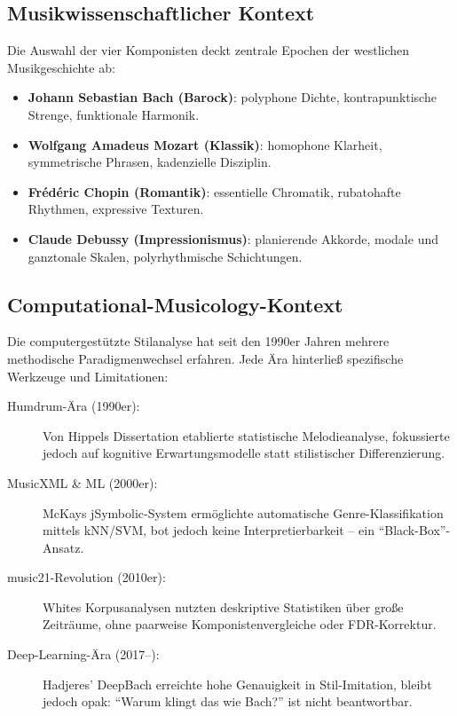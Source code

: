 \documentclass[12pt,a4paper]{article}
\theoremstyle{definition}
\begin{document}
\subsection{Musikwissenschaftlicher Kontext}
Die Auswahl der vier Komponisten deckt zentrale Epochen der westlichen Musikgeschichte ab:\autocite[Vgl. etwa][]{DebussyCharacteristics,ChopinTransformations}
\begin{itemize}
    \item \textbf{Johann Sebastian Bach (Barock)}: polyphone Dichte, kontrapunktische Strenge, funktionale Harmonik.
    \item \textbf{Wolfgang Amadeus Mozart (Klassik)}: homophone Klarheit, symmetrische Phrasen, kadenzielle Disziplin.
    \item \textbf{Frédéric Chopin (Romantik)}: essentielle Chromatik, rubatohafte Rhythmen, expressive Texturen.
    \item \textbf{Claude Debussy (Impressionismus)}: planierende Akkorde, modale und ganztonale Skalen, polyrhythmische Schichtungen.
\end{itemize}

\subsection{Computational-Musicology-Kontext}
Die computergestützte Stilanalyse hat seit den 1990er Jahren mehrere methodische Paradigmenwechsel erfahren. Jede Ära hinterließ spezifische Werkzeuge und Limitationen:

\begin{description}
    \item[Humdrum-Ära (1990er):] Von Hippels Dissertation\autocite{VonHippel2000} etablierte statistische Melodieanalyse, fokussierte jedoch auf kognitive Erwartungsmodelle statt stilistischer Differenzierung.
    \item[MusicXML \& ML (2000er):] McKays jSymbolic-System\autocite{McKay2010} ermöglichte automatische Genre-Klassifikation mittels kNN/SVM, bot jedoch keine Interpretierbarkeit -- ein \enquote{Black-Box}-Ansatz.
    \item[music21-Revolution (2010er):] Whites Korpusanalysen\autocite{White2013} nutzten deskriptive Statistiken über große Zeiträume, ohne paarweise Komponistenvergleiche oder FDR-Korrektur.
    \item[Deep-Learning-Ära (2017--):] Hadjeres' DeepBach\autocite{Hadjeres2018} erreichte hohe Genauigkeit in Stil-Imitation, bleibt jedoch opak: \enquote{Warum klingt das wie Bach?} ist nicht beantwortbar.
\end{description}
\end{document}
